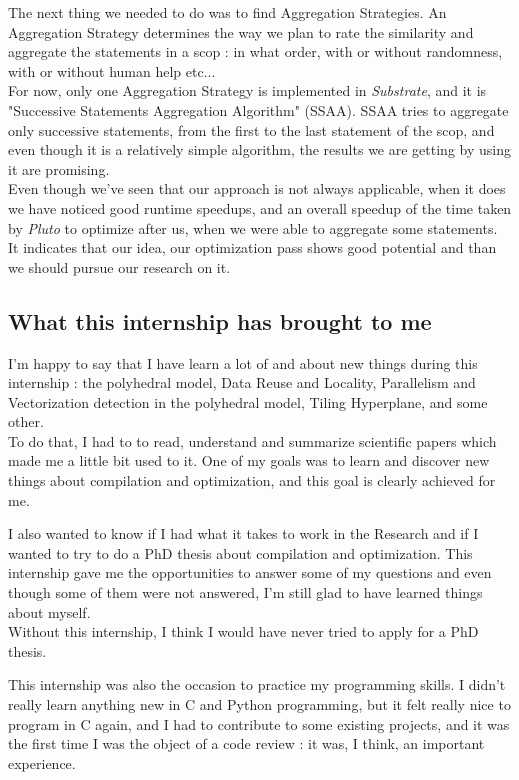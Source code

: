 \documentclass[paper=a4, fontsize=11.5pt]{scrartcl}
\numberwithin{equation}{section}        %
\numberwithin{figure}{section}          %
\numberwithin{table}{section}               %
\begin{document}
The next thing we needed to do was to find Aggregation Strategies. An Aggregation Strategy
determines the way we plan to rate the similarity and aggregate the statements in a scop : in what
order, with or without randomness, with or without human help etc...\\
For now, only one Aggregation Strategy is implemented in \textit{Substrate},
and it is "Successive Statements Aggregation Algorithm" (SSAA).
SSAA tries to aggregate only successive statements, from the first to the last
statement of the scop, and even though it is a relatively simple algorithm, the results we
are getting by using it are promising.\\
Even though we've seen that our approach is not always applicable, when it does
we have noticed good runtime speedups, and an overall speedup of the time taken by \textit{Pluto}
to optimize after us, when we were able to aggregate some statements. It indicates that our idea,
our optimization pass shows good potential and than we should pursue our research on it.

    \subsection{What this internship has brought to me}
        I'm happy to say that I have learn a lot of and about new things during this internship :
        the polyhedral model, Data Reuse and Locality, Parallelism and Vectorization detection
        in the polyhedral model, Tiling Hyperplane, and some other.\\
        To do that, I had to to read, understand and summarize scientific papers which made
        me a little bit used to it.
        One of my goals was to learn and discover new things about compilation and optimization,
        and this goal is clearly achieved for me.

        I also wanted to know if I had what it takes to work in the Research and if I wanted
        to try to do a PhD thesis about compilation and optimization. This internship gave me
        the opportunities to answer some of my questions and even though some of them were
        not answered, I'm still glad to have learned things about myself.\\
        Without this internship, I think I would have never tried to apply for a PhD thesis.

        This internship was also the occasion to practice my programming skills. I didn't
        really learn anything new in C and Python programming, but it felt really nice to
        program in C again, and I had to contribute to some existing projects, and it was
        the first time I was the object of a code review : it was, I think, an important experience.
\end{document}
